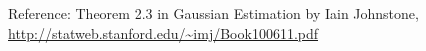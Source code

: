 \documentclass[11pt]{article}
\def\E{{\mathbb E}}
\begin{document}
\begin{enumerate}
Reference: Theorem 2.3 in Gaussian Estimation by Iain Johnstone,\\
\url{http://statweb.stanford.edu/~imj/Book100611.pdf}

%
%

\end{enumerate}
\end{document}
